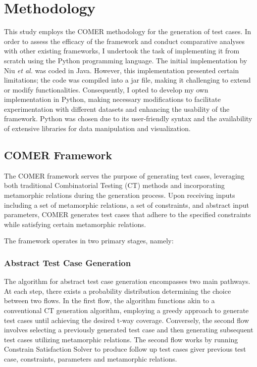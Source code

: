 
\chapter{Methodology}
\label{ch:met}

This study employs the COMER methodology for the generation of test cases.
In order to assess the efficacy of the framework and conduct comparative analyses with other existing frameworks, I undertook the task of implementing it from scratch using the Python programming language.
The initial implementation by Niu \textit{et al.} \cite{comer} was coded in Java.
However, this implementation presented certain limitations; the code was compiled into a jar file, making it challenging to extend or modify functionalities.
Consequently, I opted to develop my own implementation in Python, making necessary modifications to facilitate experimentation with different datasets and enhancing the usability of the framework.
Python was chosen due to its user-friendly syntax and the availability of extensive libraries for data manipulation and visualization.


\section{COMER Framework}\label{sec:comer-framework}

The COMER framework serves the purpose of generating test cases, leveraging both traditional Combinatorial Testing (CT) methods and incorporating metamorphic relations during the generation process.
Upon receiving inputs including a set of metamorphic relations, a set of constraints, and abstract input parameters, COMER generates test cases that adhere to the specified constraints while satisfying certain metamorphic relations.

The framework operates in two primary stages, namely:

\subsection{Abstract Test Case Generation}\label{subsec:abstract-test-case-generation}

The algorithm for abstract test case generation encompasses two main pathways.
At each step, there exists a probability distribution determining the choice between two flows.
In the first flow, the algorithm functions akin to a conventional CT generation algorithm, employing a greedy approach to generate test cases until achieving the desired t-way coverage.
Conversely, the second flow involves selecting a previously generated test case and then generating subsequent test cases utilizing metamorphic relations. The second flow works by running Constrain Satisfaction Solver to produce follow up test cases giver previous test case, constraints, parameters and metamorphic relations.

